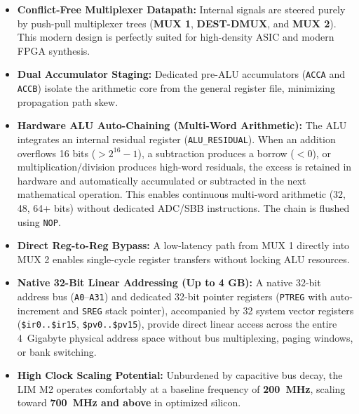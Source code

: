 \documentclass[11pt,a4paper]{article}
\newcommand{\reg}[1]{\texttt{#1}}
\begin{document}
\begin{itemize}
  \item \textbf{Conflict-Free Multiplexer Datapath:} Internal signals are steered purely by push-pull multiplexer trees (\textbf{MUX 1}, \textbf{DEST-DMUX}, and \textbf{MUX 2}). This modern design is perfectly suited for high-density ASIC and modern FPGA synthesis.
  \item \textbf{Dual Accumulator Staging:} Dedicated pre-ALU accumulators (\reg{ACCA} and \reg{ACCB}) isolate the arithmetic core from the general register file, minimizing propagation path skew.
  \item \textbf{Hardware ALU Auto-Chaining (Multi-Word Arithmetic):} The ALU integrates an internal residual register (\reg{ALU\_RESIDUAL}). When an addition overflows 16 bits ($>2^{16}-1$), a subtraction produces a borrow ($<0$), or multiplication/division produces high-word residuals, the excess is retained in hardware and automatically accumulated or subtracted in the next mathematical operation. This enables continuous multi-word arithmetic (32, 48, 64+ bits) without dedicated ADC/SBB instructions. The chain is flushed using \texttt{NOP}.
  \item \textbf{Direct Reg-to-Reg Bypass:} A low-latency path from MUX 1 directly into MUX 2 enables single-cycle register transfers without locking ALU resources.
  \item \textbf{Native 32-Bit Linear Addressing (Up to 4 GB):} A native 32-bit address bus (\texttt{A0}--\texttt{A31}) and dedicated 32-bit pointer registers (\reg{PTREG} with auto-increment and \reg{SREG} stack pointer), accompanied by 32 system vector registers (\texttt{\$ir0..\$ir15}, \texttt{\$pv0..\$pv15}), provide direct linear access across the entire 4~Gigabyte physical address space without bus multiplexing, paging windows, or bank switching.
  \item \textbf{High Clock Scaling Potential:} Unburdened by capacitive bus decay, the LIM M2 operates comfortably at a baseline frequency of \textbf{200~MHz}, scaling toward \textbf{700~MHz and above} in optimized silicon.
\end{itemize}
\end{document}
